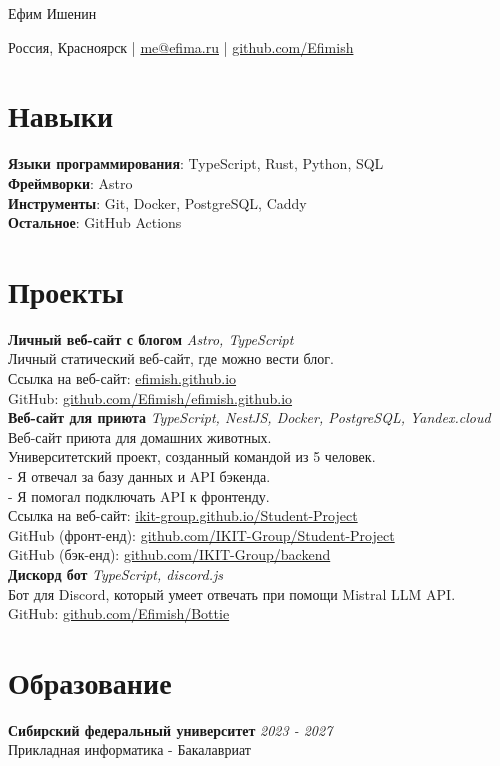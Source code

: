 \documentclass[a4paper, 12pt]{article}
\begin{document}
\centerline{\Huge Ефим Ишенин}
\vspace{10pt}
\centerline{
  Россия, Красноярск |
  \href{mailto:me@efima.ru}{me@efima.ru} |
  \href{https://github.com/Efimish}{github.com/Efimish}
}

\section{Навыки}
\textbf{Языки программирования}: TypeScript, Rust, Python, SQL \\
\textbf{Фреймворки}: Astro \\
\textbf{Инструменты}: Git, Docker, PostgreSQL, Caddy \\
\textbf{Остальное}: GitHub Actions


\section{Проекты}

\textbf{Личный веб-сайт с блогом} \hfill \textit{Astro, TypeScript} \\
Личный статический веб-сайт, где можно вести блог. \\
Ссылка на веб-сайт: \href{https://efimish.github.io/}{efimish.github.io} \\
GitHub: \href{https://github.com/Efimish/efimish.github.io}{github.com/Efimish/efimish.github.io} \\

\textbf{Веб-сайт для приюта} \hfill \textit{TypeScript, NestJS, Docker, PostgreSQL, Yandex.cloud} \\
Веб-сайт приюта для домашних животных. \\
Университетский проект, созданный командой из 5 человек. \\
- Я отвечал за базу данных и API бэкенда. \\
- Я помогал подключать API к фронтенду. \\
Ссылка на веб-сайт: \href{https://ikit-group.github.io/Student-Project/}{ikit-group.github.io/Student-Project} \\
GitHub (фронт-енд): \href{https://github.com/IKIT-Group/Student-Project}{github.com/IKIT-Group/Student-Project} \\
GitHub (бэк-енд): \href{https://github.com/IKIT-Group/backend}{github.com/IKIT-Group/backend} \\

\textbf{Дискорд бот} \hfill \textit{TypeScript, discord.js} \\
Бот для Discord, который умеет отвечать при помощи Mistral LLM API. \\
GitHub: \href{https://github.com/Efimish/Bottie}{github.com/Efimish/Bottie} \\


\section{Образование}
\textbf{Сибирский федеральный университет}
\hfill \textit{2023 - 2027} \\
Прикладная информатика - Бакалавриат
\end{document}
